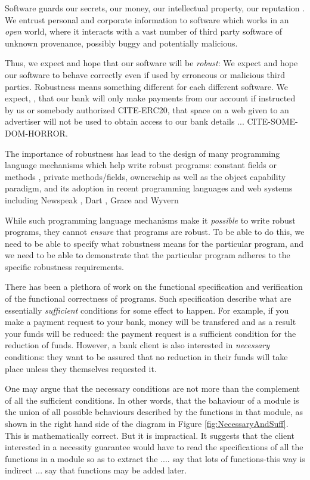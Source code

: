 Software guards our secrets, our money, our intellectual property,
our reputation \cite{covfefe}.  We entrust personal and
corporate information to software which works in an \emph{open} world, 
where  it interacts with a vast number of
third party software of unknown provenance, possibly buggy and potentially malicious.

Thus, we expect and hope that our software will be \emph{robust}:
We expect and hope our software to behave correctly even if  used 
by erroneous or malicious third parties. Robustness means 
something different for each different software.
 We expect, \eg, that our bank will only make payments 
from our account if instructed by us or somebody authorized CITE-ERC20,
that  space on a web given to an advertiser will not be used
to obtain access to our bank details ... CITE-SOME-DOM-HORROR.

The importance of robustness has lead to the design of many programming
language mechanisms which help write robust programs:
constant fields or methods \cite{...}, private methods/fields\cite{...}, ownerschip\cite{...}
as well as the object capability paradigm\cite{millerPhDThesis},
and its adoption in recent programming languages and web systems
\cite{CapJavaHayesAPLAS17,CapNetSocc17Eide,DOCaT14} including Newspeak
\cite{newspeak17}, Dart \cite{dart15}, Grace \cite{grace,graceClasses}
and Wyvern \cite{wyverncapabilities}

While such programming language mechanisms make it \textit{possible} to write robust
programs, they cannot \textit{ensure} that programs are robust. 
To be able to do this, we need to be able to specify what robustness means for the 
particular program, and we need to be able to demonstrate that the particular program 
adheres to the specific robustness requirements.

There has been a plethora of work on the functional specification and verification of the
functional correctness of programs. Such specification describe what are
essentially \emph{sufficient} conditions for some
effect to happen. For example, if you make a payment request to your bank, money will be transfered
and as a result your funds will be reduced: the payment request is a sufficient condition for the
reduction of funds. However, a bank client is also interested in \emph{necessary} conditions:
they want to be assured that no reduction in their funds will take place unless they themselves
requested it.

One may argue that the necessary conditions are not more than the complement of all the sufficient conditions.
In other words, that the bahaviour of a module is the union of all possible behaviours described by the 
functions in that module, as shown in the right hand side of the diagram in Figure \ref{fig:NecessaryAndSuff}.
This is mathematically correct. But it is impractical. It suggests that the client interested in a necessity guarantee 
would have to read the specifications of all the functions in a module so as to extract the .... say that lots of functions-this way is indirect ... say that functions may be added later.

